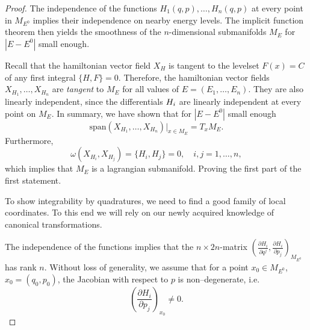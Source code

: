 \documentclass[english,fontsize=11pt,paper=a5,oneside]{scrbook}
\let\d\relax
\newcommand{\d}{\mathrm{d}}
\theoremstyle{definition}
\begin{document}
\begin{proof}
  The independence of the functions $H_1(q,p), \ldots, H_n(q,p)$ at every point in $M_{E^0}$ implies their independence on nearby energy levels. The implicit function theorem then yields the smoothness of the $n$-dimensional submanifolds $M_E$ for $|E-E^0|$ small enough.

  Recall that the hamiltonian vector field $X_H$ is tangent to the levelset $F(x)=C$ of any first integral $\big\{H,F\big\} = 0$. Therefore, the hamiltonian vector fields $X_{H_1}, \ldots, X_{H_n}$ are \emph{tangent} to $M_E$ for all values of $E=(E_1,\ldots, E_n)$.
  They are also linearly independent, since the differentials $\d H_i$ are linearly independent at every point on $M_E$.
  In summary, we have shown that for $|E-E^0|$ small enough
  \begin{equation}
    \mathrm{span}(X_{H_1}, \ldots, X_{H_n}) \big|_{x\in M_E} = T_x M_E.
  \end{equation}
  Furthermore,
  \begin{equation}
    \omega(X_{H_i}, X_{H_j}) = \big\{H_i, H_j\big\} =0, \quad i,j=1,\ldots,n,
  \end{equation}
  which implies that $M_E$ is a lagrangian submanifold. Proving the first part of the first statement.

  To show integrability by quadratures, we need to find a good family of local coordinates. To this end we will rely on our newly acquired knowledge of canonical transformations.

  The independence of the functions implies that the $n\times 2n$-matrix
  $\left(
    \frac{\partial H_i}{\partial q^j},
    \frac{\partial H_i}{\partial p_j}
    \right)_{M_{E^0}}$
  has rank $n$. Without loss of generality, we assume that for a point $x_0 \in M_{E^0}$, $x_0 =(q_0,p_0)$, the Jacobian with respect to $p$ is non--degenerate, i.e.
  \begin{equation}\label{eq:nondegHip}
    \left(
    \frac{\partial H_i}{\partial p_j}
    \right)_{x_0} \neq 0.
  \end{equation}


\end{proof}
\end{document}

